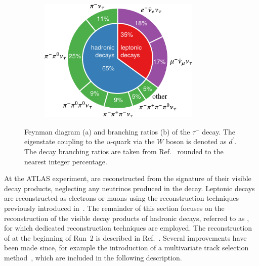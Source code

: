 \begin{figure}[htb]
\begin{subfigure}[b]{0.47\textwidth}
    \includegraphics[width=0.85\textwidth]{figs/tauid/tau_branching_pie_chart_new}

    \subcaption{}%
    \label{fig:tau_branching_ratios}
  \end{subfigure}

  \caption[Feynman diagram and branching ratios of the $\tau^{-}$
  decay.]{Feynman diagram (a) and branching ratios (b) of the $\tau^{-}$ decay.
    The eigenstate coupling to the $u$-quark via the $W$ boson is denoted as
    $d^\prime$.  The \taulepton decay branching ratios are taken from
    Ref.~\cite{pdg2020} rounded to the nearest integer percentage.}%
  \label{fig:tau_feynman_br}
\end{figure}

At the ATLAS experiment, \tauleptons are reconstructed from the signature of
their visible decay products, neglecting any neutrinos produced in the
decay. Leptonic \taulepton decays are reconstructed as electrons or muons using
the reconstruction techniques previously introduced
in~. The remainder of this section focuses on the
reconstruction of the visible decay products of hadronic \taulepton decays,
referred to as \tauhadvis, for which dedicated reconstruction techniques are
employed. The reconstruction of \tauhadvis at the beginning of Run~2 is
described in Ref.~\cite{ATLAS-CONF-2017-029}. Several improvements have been
made since, for example the introduction of a multivariate track selection
method~\cite{duschinger}, which are included in the following description.


